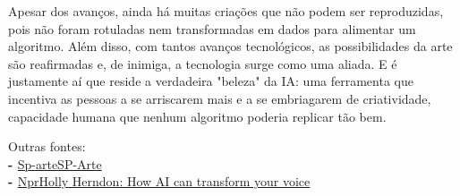{\subtitle{Conclusão}
\hspace*{1.5em} Apesar dos avanços, ainda há muitas 
criações que não podem ser reproduzidas, 
pois não foram rotuladas nem transformadas 
em dados para alimentar um algoritmo. Além 
disso, com tantos avanços tecnológicos, as 
possibilidades da arte são reafirmadas e, de 
inimiga, a tecnologia surge como uma aliada. 
E é justamente aí que reside a verdadeira 
"beleza" da IA: uma ferramenta que incentiva 
as pessoas a se arriscarem mais e a se 
embriagarem de criatividade, capacidade 
humana que nenhum algoritmo poderia 
replicar tão bem.

    \textcolor{HypePurple2}{Outras fontes:}\\
\textbf{\textcolor{HypePurple2}{- }}\href{https://www.sp-arte.com/editorial/a-arte-diante-da-inteligencia-artificial}{Sp-arteSP-Arte}\\
\textbf{\textcolor{HypePurple2}{- }}\href{https://www.npr.org/transcripts/1119220726}{NprHolly Herndon: How AI can transform your voice}


}